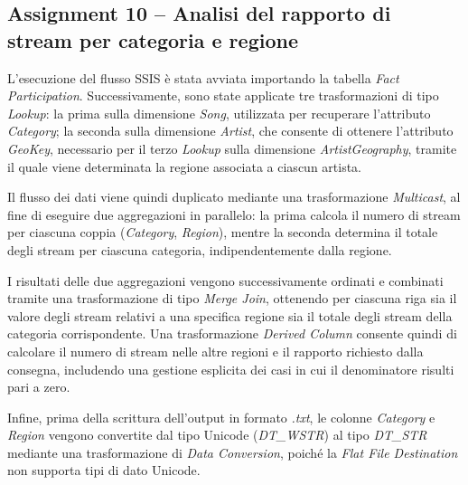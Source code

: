 \subsection*{Assignment 10 -- Analisi del rapporto di stream per categoria e regione}

L’esecuzione del flusso SSIS è stata avviata importando la tabella
\textit{Fact Participation}.
Successivamente, sono state applicate tre trasformazioni di tipo \textit{Lookup}:
la prima sulla dimensione \textit{Song}, utilizzata per recuperare l’attributo
\textit{Category}; la seconda sulla dimensione \textit{Artist}, che consente di
ottenere l’attributo \textit{GeoKey}, necessario per il terzo \textit{Lookup}
sulla dimensione \textit{ArtistGeography}, tramite il quale viene determinata la
regione associata a ciascun artista.

Il flusso dei dati viene quindi duplicato mediante una trasformazione
\textit{Multicast}, al fine di eseguire due aggregazioni in parallelo: la prima
calcola il numero di stream per ciascuna coppia
(\textit{Category}, \textit{Region}), mentre la seconda determina il totale degli
stream per ciascuna categoria, indipendentemente dalla regione.

I risultati delle due aggregazioni vengono successivamente ordinati e combinati
tramite una trasformazione di tipo \textit{Merge Join}, ottenendo per ciascuna
riga sia il valore degli stream relativi a una specifica regione sia il totale
degli stream della categoria corrispondente. Una trasformazione
\textit{Derived Column} consente quindi di calcolare il numero di stream nelle
altre regioni e il rapporto richiesto dalla consegna, includendo una gestione
esplicita dei casi in cui il denominatore risulti pari a zero.

Infine, prima della scrittura dell’output in formato \textit{.txt}, le colonne
\textit{Category} e \textit{Region} vengono convertite dal tipo Unicode
(\textit{DT\_WSTR}) al tipo \textit{DT\_STR} mediante una trasformazione di
\textit{Data Conversion}, poiché la \textit{Flat File Destination} non supporta
tipi di dato Unicode.
